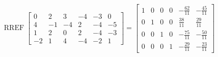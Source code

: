 \begin{exerciseAnswer} 


\[\operatorname{RREF} \left[\begin{array}{cccccc}
0 & 2 & 3 & -4 & -3 & 0 \\
4 & -1 & -4 & 2 & -4 & -5 \\
1 & 2 & 0 & 2 & -4 & -3 \\
-2 & 1 & 4 & -4 & -2 & 1
\end{array}\right] = \left[\begin{array}{cccccc}
1 & 0 & 0 & 0 & -\frac{62}{11} & -\frac{45}{11} \\
0 & 1 & 0 & 0 & \frac{38}{11} & \frac{29}{11} \\
0 & 0 & 1 & 0 & -\frac{75}{11} & -\frac{50}{11} \\
0 & 0 & 0 & 1 & -\frac{29}{11} & -\frac{23}{11}
\end{array}\right] \]



\end{exerciseAnswer}
